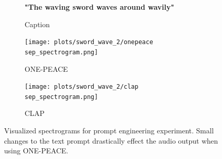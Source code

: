 \begin{figure}[!htbp]
    \begin{subfigure}[b]{0.3\textwidth}
        \centering
        \scriptsize\textbf{"The waving sword waves around wavily"}
        \vspace{13mm}
        \caption*{Caption}
    \end{subfigure}
    \begin{subfigure}[b]{0.3\textwidth}
        \centering
        \texttt{[image: plots/sword\_wave\_2/onepeace sep\_spectrogram.png]}
        \caption*{ONE-PEACE}
    \end{subfigure}
    \begin{subfigure}[b]{0.3\textwidth}
        \centering
        \texttt{[image: plots/sword\_wave\_2/clap sep\_spectrogram.png]}
        \caption*{CLAP}
    \end{subfigure}
    
    \caption{Visualized spectrograms for prompt engineering experiment. Small changes to the text prompt drastically effect the audio output when using ONE-PEACE.}
    
    \label{fig:separation_results}

\end{figure}
